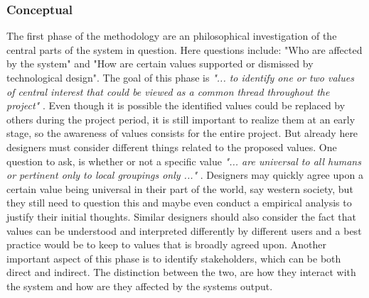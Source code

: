 \subsubsection{Conceptual}
The first phase of the methodology are an philosophical investigation of the central parts of the system in question. Here questions include: "Who are affected by the system" and "How are certain values supported or dismissed by technological design".\newline 
The goal of this phase is \textit{"... to identify one or two values of central interest that could be viewed as a common thread throughout the project"} \citep[p. 703]{IntegratingEthicsCummings}. Even though it is possible the identified values could be replaced by others during the project period, it is still important to realize them at an early stage, so the awareness of values consists for the entire project. But already here designers must consider different things related to the proposed values. One question to ask, is whether or not a specific value \textit{"... are universal to all humans or pertinent only to local groupings only ..."} \citep[p. 326]{EmbodyingValues}. Designers may quickly agree upon a certain value being universal in their part of the world, say western society, but they still need to question this and maybe even conduct a empirical analysis to justify their initial thoughts. Similar designers should also consider the fact that values can be understood and interpreted differently by different users and a best practice would be to keep to values that is broadly agreed upon. \newline 
Another important aspect of this phase is to identify stakeholders, which can be both direct and indirect. The distinction between the two, are how they interact with the system and how are they affected by the systems output. 

